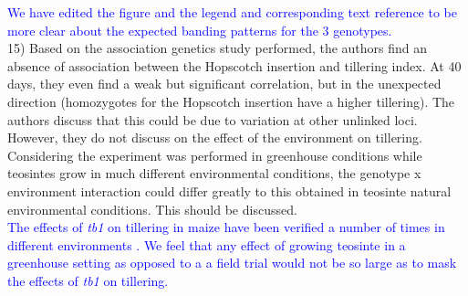 \documentclass[11pt]{article}
\newcommand{\res}[1]{\noindent \textcolor{blue}{{#1}} \\}
\begin{document}
\res{We have edited the figure and the legend and corresponding text reference to be more clear about the expected banding patterns for the 3 genotypes.}

15) Based on the association genetics study performed, the authors find an absence of association between the Hopscotch insertion and tillering index. At 40 days, they even find a weak but significant correlation, but in the unexpected direction (homozygotes for the Hopscotch insertion have a higher tillering). The authors discuss that this could be due to variation at other unlinked loci. However, they do not discuss on the effect of the environment on tillering. Considering the experiment was performed in greenhouse conditions while teosintes grow in much different environmental conditions, the genotype x environment interaction could differ greatly to this obtained in teosinte natural environmental conditions. This should be discussed.\\

\res{The effects of \emph{tb1} on tillering in maize have been verified a number of times in different environments \citet{Briggs2007, Clark2006, StuderDoebley2012, Studer2011}. We feel that any effect of growing teosinte in a greenhouse setting as opposed to a a field trial would not be so large as to mask the effects of \emph{tb1} on tillering.}



\end{document}
